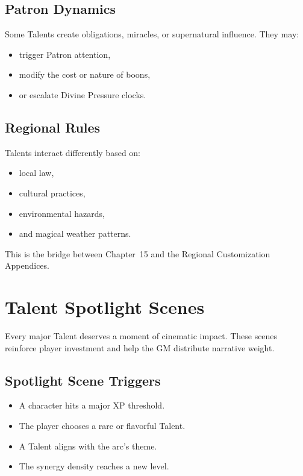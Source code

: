 \documentclass[11pt]{book}
\begin{document}
\subsection{Patron Dynamics}
Some Talents create obligations, miracles, or supernatural influence.
They may:
\begin{itemize}
    \item trigger Patron attention,  
    \item modify the cost or nature of boons,  
    \item or escalate Divine Pressure clocks.
\end{itemize}

\subsection{Regional Rules}
Talents interact differently based on:
\begin{itemize}
    \item local law,  
    \item cultural practices,  
    \item environmental hazards,  
    \item and magical weather patterns.
\end{itemize}

This is the bridge between Chapter~15 and the Regional Customization Appendices.

\section{Talent Spotlight Scenes}

Every major Talent deserves a moment of cinematic impact.
These scenes reinforce player investment and help the GM distribute narrative weight.

\subsection{Spotlight Scene Triggers}

\begin{itemize}
    \item A character hits a major XP threshold.
    \item The player chooses a rare or flavorful Talent.
    \item A Talent aligns with the arc's theme.
    \item The synergy density reaches a new level.
\end{itemize}
\end{document}
